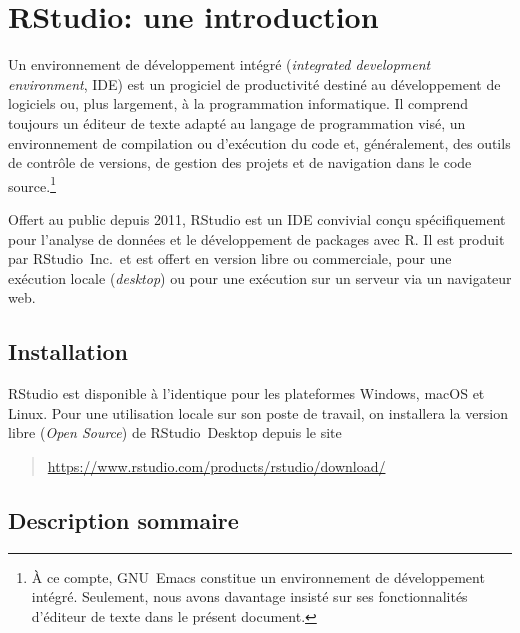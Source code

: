 \chapter{RStudio: une introduction}
\label{rstudio}

Un environnement de développement intégré (\emph{integrated
  development environment}, IDE) est un progiciel de productivité
destiné au développement de logiciels ou, plus largement, à la
programmation informatique. Il comprend toujours un éditeur de texte
adapté au langage de programmation visé, un environnement de
compilation ou d'exécution du code et, généralement, des outils de
contrôle de versions, de gestion des projets et de navigation dans le
code source.\footnote{%
  À ce compte, GNU~Emacs constitue un environnement de développement
  intégré. Seulement, nous avons davantage insisté sur ses
  fonctionnalités d'éditeur de texte dans le présent document.} %

Offert au public depuis 2011, RStudio est un IDE convivial conçu
spécifiquement pour l'analyse de données et le développement de
packages avec R. Il est produit par RStudio~Inc.\ et est offert en
version libre ou commerciale, pour une exécution locale
(\emph{desktop}) ou pour une exécution sur un serveur via un
navigateur web.


\section{Installation}
\label{rstudio:installation}

RStudio est disponible à l'identique pour les plateformes Windows,
macOS et Linux. Pour une utilisation locale sur son poste de travail,
on installera la version libre (\emph{Open Source}) de RStudio~Desktop
depuis le site
\begin{quote}
  \url{https://www.rstudio.com/products/rstudio/download/}
\end{quote}


\section{Description sommaire}
\label{rstudio:description}

